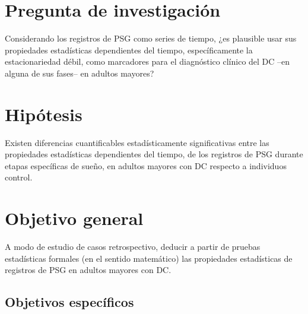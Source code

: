 
\section{Pregunta de investigaci\'on}

Considerando los registros de PSG como series de tiempo,
¿es plausible usar sus propiedades estad\'isticas dependientes del tiempo, espec\'ificamente
la estacionariedad d\'ebil,
como marcadores para el diagn\'ostico cl\'inico del DC --en alguna de 
sus fases-- en adultos mayores?


\section{Hip\'otesis}

Existen diferencias cuantificables estad\'isticamente significativas entre las propiedades
estad\'isticas dependientes del tiempo, de los registros de PSG
durante etapas espec\'ificas de sue\~no, en adultos
mayores con DC respecto a individuos control.


\section{Objetivo general}

A modo de estudio de casos retrospectivo,
deducir a partir de pruebas estad\'isticas formales (en el sentido matem\'atico) las propiedades
estad\'isticas de registros de PSG en adultos mayores con DC.

\subsection{Objetivos espec\'ificos}

